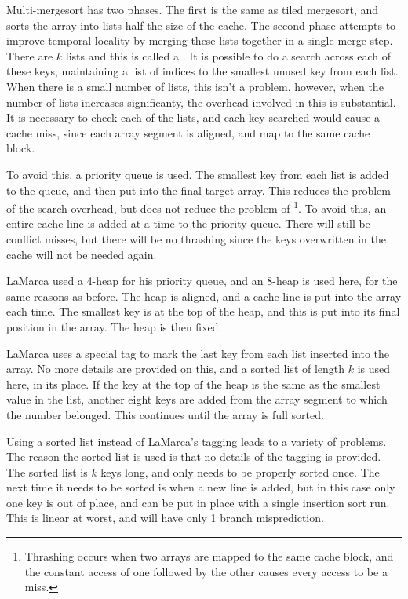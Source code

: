 Multi-mergesort has two phases. The first is the same as tiled mergesort, and
sorts the array into lists half the size of the cache. The second phase attempts
to improve temporal locality by merging these lists together in a single merge
step. There are $k$ lists and this is called a . It is possible
to do a search across each of these keys, maintaining a list of indices to the
smallest unused key from each list. When there is a small number of lists, this
isn't a problem, however, when the number of lists increases significanty, the
overhead involved in this is substantial. It is necessary to check each of the
lists, and each key searched would cause a cache miss, since each array segment
is aligned, and map to the same cache block.

To avoid this, a priority queue is used. The smallest key from each list is
added to the queue, and then put into the final target array. This reduces the
problem of the search overhead, but does not reduce the problem of
\footnote{Thrashing occurs when two arrays are mapped to the same
cache block, and the constant access of one followed by the other causes every
access to be a miss.}.  To avoid this, an entire cache line is added at a time
to the priority queue. There will still be conflict misses, but there will be no
thrashing since the keys overwritten in the cache will not be needed again.

LaMarca used a 4-heap for his priority queue, and an 8-heap is used here, for
the same reasons as before. The heap is aligned, and a cache line
is put into the array each time. The smallest key is at the top of the heap,
and this is put into its final position in the array. The heap is then fixed.

LaMarca uses a special tag to mark the last key from each list inserted into
the array. No more details are provided on this, and a sorted list of length $k$
is used here, in its place.  If the key at the top of the heap is the same as
the smallest value in the list, another eight keys are added from the array
segment to which the number belonged. This continues until the array is full
sorted.

Using a sorted list instead of LaMarca's tagging leads to a variety of problems.
The reason the sorted list is used is that no details of the tagging is
provided. The sorted list is $k$ keys long, and only needs to be properly sorted
once. The next time it needs to be sorted is when a new line is added, but in
this case only one key is out of place, and can be put in place with a single
insertion sort run. This is linear at worst, and will have only 1 branch
misprediction.

